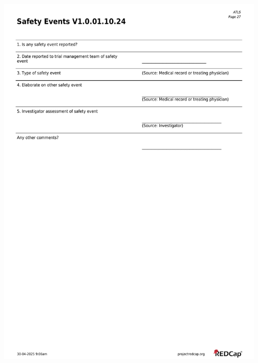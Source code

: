 \documentclass[
]{scrartcl}
\begin{document}
\includegraphics{../case-record-form/instrument-pdfs/pages/all-instruments-27.pdf}
\end{document}
